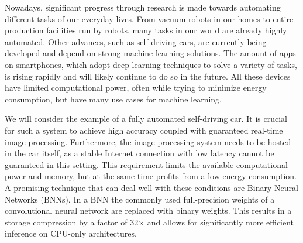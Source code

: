 \documentclass[10pt,twocolumn,letterpaper]{article}
\begin{document}

Nowadays, significant progress through research is made towards automating different tasks of our everyday lives.
From vacuum robots in our homes to entire production facilities run by robots, many tasks in our world are already highly automated.
Other advances, such as self-driving cars, are currently being developed and depend on strong machine learning solutions.
The amount of apps on smartphones, which adopt deep learning techniques to solve a variety of tasks, is rising rapidly and will likely continue to do so in the future.
All these devices have limited computational power, often while trying to minimize energy consumption, but have many use cases for machine learning. %

We will consider the example of a fully automated self-driving car. %
It is crucial for such a system to achieve high accuracy coupled with guaranteed real-time image processing.
Furthermore, the image processing system needs to be hosted in the car itself, as a stable Internet connection with low latency cannot be guaranteed in this setting.
This requirement limits the available computational power and memory, but at the same time profits from a low energy consumption.
A promising technique that can deal well with these conditions are Binary Neural Networks (BNNs).
In a BNN the commonly used full-precision weights of a convolutional neural network are replaced with binary weights.
This results in a storage compression by a factor of 32$\times$ and allows for significantly more efficient inference on CPU-only architectures.
\end{document}
